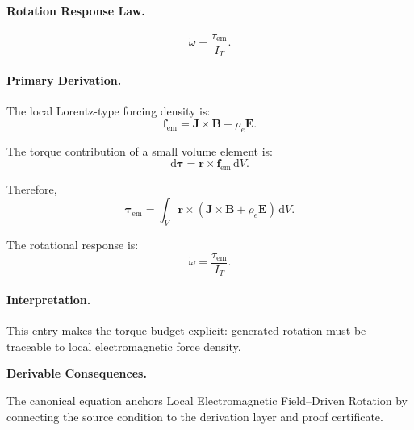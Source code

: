 \paragraph{Rotation Response Law.}
\begin{equation}
\dot{\omega}
=
\frac{\tau_{\mathrm{em}}}{I_T}.
\end{equation}

\paragraph{Primary Derivation.}
The local Lorentz-type forcing density is:
\begin{equation}
\mathbf{f}_{\mathrm{em}}
=
\mathbf{J}\times\mathbf{B}
+
\rho_e\mathbf{E}.
\end{equation}

The torque contribution of a small volume element is:
\begin{equation}
\mathrm{d}\boldsymbol{\tau}
=
\mathbf{r}\times\mathbf{f}_{\mathrm{em}}\,\mathrm{d}V .
\end{equation}

Therefore,
\begin{equation}
\boldsymbol{\tau}_{\mathrm{em}}
=
\int_V
\mathbf{r}\times
\left(
\mathbf{J}\times\mathbf{B}
+
\rho_e\mathbf{E}
\right)
\,\mathrm{d}V .
\end{equation}

The rotational response is:
\begin{equation}
\boxed{
\dot{\omega}
=
\frac{\tau_{\mathrm{em}}}{I_T}.
}
\end{equation}

\paragraph{Interpretation.}
This entry makes the torque budget explicit: generated rotation must be traceable to local electromagnetic force density.

\par\vspace{0.35em}
\noindent\textbf{Derivable Consequences.}\quad
\begingroup
\footnotesize
\raggedright
The canonical equation anchors Local Electromagnetic Field--Driven Rotation by connecting the source condition to the derivation layer and proof certificate.
\par\endgroup

